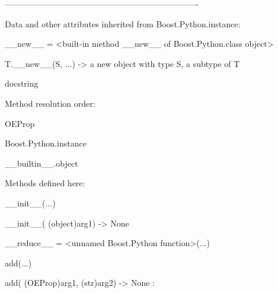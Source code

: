 \documentclass[letterpaper,10pt,english]{sphinxmanual}
\begin{document}
\begin{description}
\begin{description}
\begin{DUlineblock}{0em}
\item[] ----------------------------------------------------------------------
\item[] Data and other attributes inherited from Boost.Python.instance:
\item[] 
\item[] \_\_new\_\_ = \textless{}built-in method \_\_new\_\_ of Boost.Python.class object\textgreater{}
\item[]
\begin{DUlineblock}{\DUlineblockindent}
\item[] T.\_\_new\_\_(S, ...) -\textgreater{} a new object with type S, a subtype of T
\end{DUlineblock}
\end{DUlineblock}

\item[{class OEProp(Boost.Python.instance)}] \leavevmode
\begin{DUlineblock}{0em}
\item[] docstring
\item[] 
\item[] Method resolution order:
\item[]
\begin{DUlineblock}{\DUlineblockindent}
\item[] OEProp
\item[] Boost.Python.instance
\item[] \_\_builtin\_\_.object
\item[] 
\end{DUlineblock}
\item[] Methods defined here:
\item[] 
\item[] \_\_init\_\_(...)
\item[]
\begin{DUlineblock}{\DUlineblockindent}
\item[] \_\_init\_\_( (object)arg1) -\textgreater{} None
\item[] 
\end{DUlineblock}
\item[] \_\_reduce\_\_ = \textless{}unnamed Boost.Python function\textgreater{}(...)
\item[] 
\item[] add(...)
\item[]
\begin{DUlineblock}{\DUlineblockindent}
\item[] add( (OEProp)arg1, (str)arg2) -\textgreater{} None :
\item[]

\end{DUlineblock}
\end{DUlineblock}
\end{description}
\end{description}
\end{document}
